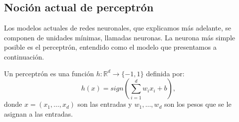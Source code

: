 \documentclass[11pt,twoside,titlepage,a4paper]{article}
\numberwithin{equation}{section} %
\theoremstyle{usual}
\begin{document}
        
        
        

\subsection{Noción actual de perceptrón}
    Los modelos actuales de redes neuronales, que explicamos más adelante, se componen de unidades mínimas, llamadas neuronas. La neurona más simple posible es el perceptrón, entendido como el modelo que presentamos a continuación.
    
    Un perceptrón \cite{yaser} es una función $h: \mathbb R ^ d \longrightarrow \{-1, 1\}$ definida por:
    \begin{equation}
     h(x) = sign( \sum_{i=1}^d w_i x_i + b ),
    \end{equation}
    donde $x = (x_1, \dots, x_d)$ son las entradas y $w_1, \dots, w_d$ son los pesos que se le asignan a las entradas.
    
\end{document}
